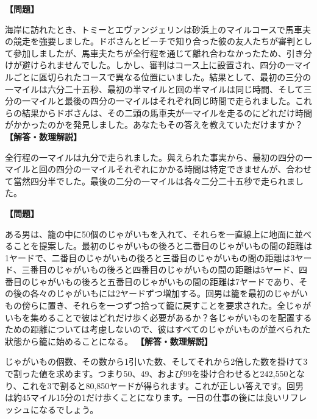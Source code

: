 \documentclass[10pt,a4paper,oneside,openany]{ltjsbook}
\begin{document}
\begin{tcolorbox}[colback=softblue,colframe=primaryblue,title=\textbf{第 73 問：馬車夫の競走 （原題: DONKEY RIDING.）},arc=2mm,boxrule=1pt,breakable]
\textbf{【問題】}\par\vspace{0.3em}
海岸に訪れたとき、トミーとエヴァンジェリンは砂浜上のマイルコースで馬車夫の競走を強要しました。ドボさんとビーチで知り合った彼の友人たちが審判として參加しましたが、馬車夫たちが全行程を通じて離れ合わなかったため、引き分けが避けられませんでした。しかし、審判はコース上に設置され、四分の一マイルごとに區切られたコースで異なる位置にいました。結果として、最初の三分の一マイルは六分二十五秒、最初の半マイルと回の半マイルは同じ時間、そして三分の一マイルと最後の四分の一マイルはそれぞれ同じ時間で走られました。これらの結果からドボさんは、その二頭の馬車夫が一マイルを走るのにどれだけ時間がかかったのかを発見しました。あなたもその答えを教えていただけますか？
\tcblower
\textbf{【解答・数理解説】}\par\vspace{0.3em}
全行程の一マイルは九分で走られました。與えられた事実から、最初の四分の一マイルと回の四分の一マイルそれぞれにかかる時間は特定できませんが、合わせて當然四分半でした。最後の二分の一マイルは各々二分二十五秒で走られました。
\end{tcolorbox}

\begin{tcolorbox}[colback=softblue,colframe=primaryblue,title=\textbf{第 74 問：籠の中のじゃがいも （原題: THE BASKET OF POTATOES.）},arc=2mm,boxrule=1pt,breakable]
\textbf{【問題】}\par\vspace{0.3em}
ある男は、籠の中に50個のじゃがいもを入れて、それらを一直線上に地面に並べることを提案した。最初のじゃがいもの後ろと二番目のじゃがいもの間の距離は1ヤードで、二番目のじゃがいもの後ろと三番目のじゃがいもの間の距離は3ヤード、三番目のじゃがいもの後ろと四番目のじゃがいもの間の距離は5ヤード、四番目のじゃがいもの後ろと五番目のじゃがいもの間の距離は7ヤードであり、その後の各々のじゃがいもには2ヤードずつ増加する。回男は籠を最初のじゃがいもの傍らに置き、それらを一つずつ拾って籠に戻すことを要求された。全じゃがいもを集めることで彼はどれだけ歩く必要があるか？各じゃがいものを配置するための距離については考慮しないので、彼はすべてのじゃがいものが並べられた狀態から籠に始めることになる。
\tcblower
\textbf{【解答・数理解説】}\par\vspace{0.3em}
じゃがいもの個数、その数から1引いた数、そしてそれから2倍した数を掛けて3で割った値を求めます。つまり50、49、および99を掛け合わせると242,550となり、これを3で割ると80,850ヤードが得られます。これが正しい答えです。回男は約45マイル15分の1だけ歩くことになります。一日の仕事の後には良いリフレッシュになるでしょう。
\end{tcolorbox}
\end{document}
